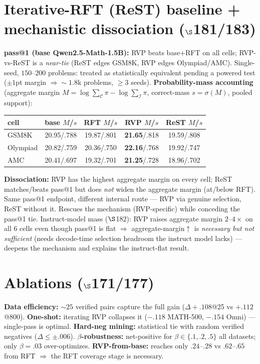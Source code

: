 \documentclass[a4paper,10pt]{article}
\newcommand{\best}[1]{\textbf{#1}}
\begin{document}
\section{Iterative-RFT (ReST) baseline + mechanistic dissociation ($\S$181/183)}
\textbf{pass@1 (base Qwen2.5-Math-1.5B):} RVP beats base+RFT on all cells; RVP-vs-ReST is a \emph{near-tie}
(ReST edges GSM8K, RVP edges Olympiad/AMC). Single-seed, $150$--$200$ problems: treated as statistically
equivalent pending a powered test ($\pm1$pt margin $\Rightarrow \sim\!1.8$k problems, $\ge3$ seeds).
\textbf{Probability-mass accounting} (aggregate margin $M=\log\sum_{\mathcal C}\pi-\log\sum_{\mathcal I}\pi$,
correct-mass $s=\sigma(M)$, pooled support):
\begin{longtable}{lcccc}
\toprule
cell & base $M$/$s$ & RFT $M$/$s$ & \best{RVP $M$/$s$} & ReST $M$/$s$ \\
\midrule
GSM8K & 20.95/.788 & 19.87/.801 & \best{21.65}/.818 & 19.59/.808 \\
Olympiad & 20.82/.759 & 20.36/.750 & \best{22.16}/.768 & 19.92/.747 \\
AMC & 20.41/.697 & 19.32/.701 & \best{21.25}/.728 & 18.96/.702 \\
\bottomrule
\end{longtable}
\textbf{Dissociation:} RVP has the highest aggregate margin on every cell; ReST matches/beats pass@1 but does
\emph{not} widen the aggregate margin (at/below RFT). Same pass@1 endpoint, different internal route --- RVP
via genuine selection, ReST without it. Rescues the mechanism (RVP-specific) while conceding the pass@1 tie.
Instruct-model mass ($\S$182): RVP raises aggregate margin $2$--$4\times$ on all 6 cells even though pass@1
is flat $\Rightarrow$ aggregate-margin$\uparrow$ is \emph{necessary but not sufficient} (needs decode-time
selection headroom the instruct model lacks) --- deepens the mechanism and explains the instruct-flat result.

\section{Ablations ($\S$171/177)}
\textbf{Data efficiency:} $\sim\!25$ verified pairs capture the full gain ($\Delta+.108$@25 vs $+.112$@800).
\textbf{One-shot:} iterating RVP collapses it ($-.118$ MATH-500, $-.154$ Omni) --- single-pass is optimal.
\textbf{Hard-neg mining:} statistical tie with random verified negatives ($\Delta\le\pm.006$).
\textbf{$\beta$-robustness:} net-positive for $\beta\in\{.1,.2,.5\}$ all datasets; only $\beta{=}.03$
over-optimizes. \textbf{RVP-from-base:} reaches only $.24$--$.28$ vs $.62$--$.65$ from RFT $\Rightarrow$ the
RFT coverage stage is necessary.
\end{document}
